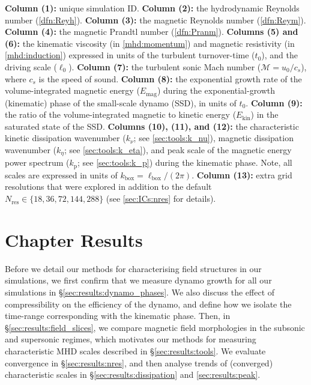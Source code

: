 \documentclass[12pt,twoside]{extreport}
\newcommand{\mSonicMach}{\ensuremath{\mathcal{M}}} %
\begin{document}
\begin{table}
{{\begin{threeparttable}
\begin{tablenotes}
    \textbf{Column (1):} unique simulation ID. \textbf{Column (2):} the hydrodynamic Reynolds number (\autoref{dfn:Reyh}). \textbf{Column (3):} the magnetic Reynolds number (\autoref{dfn:Reym}). \textbf{Column (4):} the magnetic Prandtl number (\autoref{dfn:Pranm}). \textbf{Columns (5) and (6):} the kinematic viscosity (in \autoref{mhd:momentum}) and magnetic resistivity (in \autoref{mhd:induction}) expressed in units of the turbulent turnover-time ($t_0$), and the driving scale ($\ell_0$). \textbf{Column (7):} the turbulent sonic Mach number ($\mSonicMach = u_0 / c_s$), where $c_s$ is the speed of sound. \textbf{Column (8):} the exponential growth rate of the volume-integrated magnetic energy ($E_{\mathrm{mag}}$) during the exponential-growth (kinematic) phase of the small-scale dynamo (SSD), in units of $t_0$. \textbf{Column (9):} the ratio of the volume-integrated magnetic to kinetic energy ($E_{\mathrm{kin}}$) in the saturated state of the SSD. \textbf{Columns (10), (11), and (12):} the characteristic kinetic dissipation wavenumber ($k_{\nu}$; see \autoref{sec:tools:k_nu}), magnetic dissipation wavenumber ($k_{\eta}$; see \autoref{sec:tools:k_eta}), and peak scale of the magnetic energy power spectrum ($k_{\mathrm{p}}$; see \autoref{sec:tools:k_p}) during the kinematic phase. Note, all scales are expressed in units of $k_{\mathrm{box}} = \ell_{\mathrm{box}}/(2\pi)$. \textbf{Column (13):} extra grid resolutions that were explored in addition to the default $N_\mathrm{res} \in \{18, 36, 72, 144, 288\}$ (see \autoref{sec:ICs:nres} for details).
\end{tablenotes}
\end{threeparttable}%
}%
}
\end{table}


\section{Chapter Results}
\label{sec:results}

Before we detail our methods for characterising field structures in our simulations, we first confirm that we measure dynamo growth for all our simulations in \S\ref{sec:results:dynamo_phases}. We also discuss the effect of compressibility on the efficiency of the dynamo, and define how we isolate the time-range corresponding with the kinematic phase. Then, in \S\ref{sec:results:field_slices}, we compare magnetic field morphologies in the subsonic and supersonic regimes, which motivates our methods for measuring characteristic MHD scales described in \S\ref{sec:results:tools}. We evaluate convergence in \S\ref{sec:results:nres}, and then analyse trends of (converged) characteristic scales in \S\ref{sec:results:dissipation} and \ref{sec:results:peak}.
\end{document}
